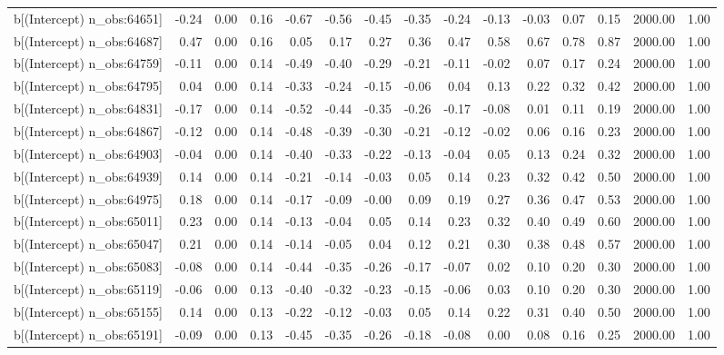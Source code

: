 \begin{table}[ht]
\begin{tabular}{rrrrrrrrrrrrrrr}
  b[(Intercept) n\_obs:64651] & -0.24 & 0.00 & 0.16 & -0.67 & -0.56 & -0.45 & -0.35 & -0.24 & -0.13 & -0.03 & 0.07 & 0.15 & 2000.00 & 1.00 \\ 
  b[(Intercept) n\_obs:64687] & 0.47 & 0.00 & 0.16 & 0.05 & 0.17 & 0.27 & 0.36 & 0.47 & 0.58 & 0.67 & 0.78 & 0.87 & 2000.00 & 1.00 \\ 
  b[(Intercept) n\_obs:64759] & -0.11 & 0.00 & 0.14 & -0.49 & -0.40 & -0.29 & -0.21 & -0.11 & -0.02 & 0.07 & 0.17 & 0.24 & 2000.00 & 1.00 \\ 
  b[(Intercept) n\_obs:64795] & 0.04 & 0.00 & 0.14 & -0.33 & -0.24 & -0.15 & -0.06 & 0.04 & 0.13 & 0.22 & 0.32 & 0.42 & 2000.00 & 1.00 \\ 
  b[(Intercept) n\_obs:64831] & -0.17 & 0.00 & 0.14 & -0.52 & -0.44 & -0.35 & -0.26 & -0.17 & -0.08 & 0.01 & 0.11 & 0.19 & 2000.00 & 1.00 \\ 
  b[(Intercept) n\_obs:64867] & -0.12 & 0.00 & 0.14 & -0.48 & -0.39 & -0.30 & -0.21 & -0.12 & -0.02 & 0.06 & 0.16 & 0.23 & 2000.00 & 1.00 \\ 
  b[(Intercept) n\_obs:64903] & -0.04 & 0.00 & 0.14 & -0.40 & -0.33 & -0.22 & -0.13 & -0.04 & 0.05 & 0.13 & 0.24 & 0.32 & 2000.00 & 1.00 \\ 
  b[(Intercept) n\_obs:64939] & 0.14 & 0.00 & 0.14 & -0.21 & -0.14 & -0.03 & 0.05 & 0.14 & 0.23 & 0.32 & 0.42 & 0.50 & 2000.00 & 1.00 \\ 
  b[(Intercept) n\_obs:64975] & 0.18 & 0.00 & 0.14 & -0.17 & -0.09 & -0.00 & 0.09 & 0.19 & 0.27 & 0.36 & 0.47 & 0.53 & 2000.00 & 1.00 \\ 
  b[(Intercept) n\_obs:65011] & 0.23 & 0.00 & 0.14 & -0.13 & -0.04 & 0.05 & 0.14 & 0.23 & 0.32 & 0.40 & 0.49 & 0.60 & 2000.00 & 1.00 \\ 
  b[(Intercept) n\_obs:65047] & 0.21 & 0.00 & 0.14 & -0.14 & -0.05 & 0.04 & 0.12 & 0.21 & 0.30 & 0.38 & 0.48 & 0.57 & 2000.00 & 1.00 \\ 
  b[(Intercept) n\_obs:65083] & -0.08 & 0.00 & 0.14 & -0.44 & -0.35 & -0.26 & -0.17 & -0.07 & 0.02 & 0.10 & 0.20 & 0.30 & 2000.00 & 1.00 \\ 
  b[(Intercept) n\_obs:65119] & -0.06 & 0.00 & 0.13 & -0.40 & -0.32 & -0.23 & -0.15 & -0.06 & 0.03 & 0.10 & 0.20 & 0.30 & 2000.00 & 1.00 \\ 
  b[(Intercept) n\_obs:65155] & 0.14 & 0.00 & 0.13 & -0.22 & -0.12 & -0.03 & 0.05 & 0.14 & 0.22 & 0.31 & 0.40 & 0.50 & 2000.00 & 1.00 \\ 
  b[(Intercept) n\_obs:65191] & -0.09 & 0.00 & 0.13 & -0.45 & -0.35 & -0.26 & -0.18 & -0.08 & 0.00 & 0.08 & 0.16 & 0.25 & 2000.00 & 1.00 \\ 

\end{tabular}
\end{table}
